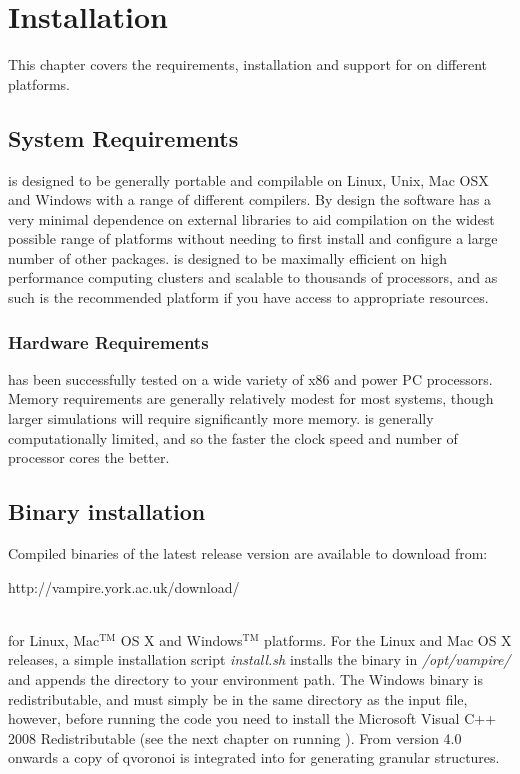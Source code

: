 \chapter{Installation}\label{chap:installation}

This chapter covers the requirements, installation and support for \vampire on different platforms. 

\section*{System Requirements}
\vampire is designed to be generally portable and compilable on Linux, Unix, Mac OSX and Windows with a range of different compilers. By design the software has a very minimal dependence on external libraries to aid compilation on the widest possible range of platforms without needing to first install and configure a large number of other packages. \vampire is designed to be maximally efficient on high performance computing clusters and scalable to thousands of processors, and as such is the recommended platform if you have access to appropriate resources. 

\subsection*{Hardware Requirements}
\vampire has been successfully tested on a wide variety of x86 and power PC processors. Memory requirements are generally relatively modest for most systems, though larger simulations will require significantly more memory. \vampire is generally computationally limited, and so the faster the clock speed and number of processor cores the better.

\section*{Binary installation}
Compiled binaries of the latest release version are available to download from:\\

\begin{minipage}[c]{\textwidth}
\centering
http://vampire.york.ac.uk/download/
\end{minipage}\\

\noindent for Linux, Mac$^{\mathrm{TM}}$ OS X and Windows$^{\mathrm{TM}}$ platforms. For the Linux and Mac OS X releases, a simple installation script \textit{install.sh} installs the binary in \textit{/opt/vampire/} and appends the directory to your environment path. The Windows binary is redistributable, and must simply be in the same directory as the input file, however, before running the code you need to install the Microsoft Visual C++ 2008 Redistributable (see the next chapter on running \vampire). From version 4.0 onwards a copy of qvoronoi is integrated into \vampire for generating granular structures. 

